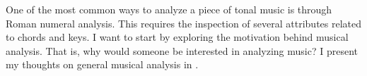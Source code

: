 

One of the most common ways to analyze a piece of tonal
music is through Roman numeral analysis. This requires the
inspection of several attributes related to chords and keys.
I want to start by exploring the motivation behind musical
analysis. That is, why would someone be interested in
analyzing music? I present my thoughts on general musical
analysis in .
